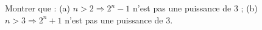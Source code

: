 Montrer que : (a) $n > 2 \Rightarrow 2^n - 1$ n'est pas une puissance de $3$ ; (b) $n > 3 \Rightarrow 2^n + 1$ n'est pas une puissance de $3$.
